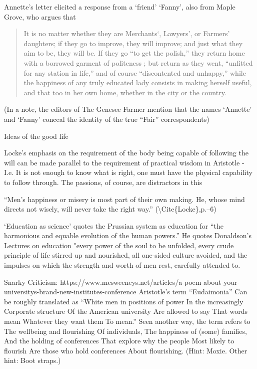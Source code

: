Annette's letter elicited a response from a `friend' `Fanny', also from Maple Grove, who argues that 

\begin{quote}

It is no matter whether they are Merchants`, Lawyers', or Farmers' daughters; if they go to improve, they will improve; and just what they aim to be, they will be. If they go ``to get the polish,'' they return home with a borrowed garment of politeness ; but return as they went, ``unfitted for any station in life,'' and of course ``discontented and unhappy,'' while the happiness of any truly educated lady consists in making herself useful, and that too in her own home, whether in the city or the country. ~\citep[p. 128]{Fanny:1840tu}
\end{quote}

(In a note, the editors of The Genesee Farmer mention that the names `Annette' and `Fanny' conceal the identity of the true ``Fair'' correspondents) 

Ideas of the good life

Locke's emphasis on the requirement of the body being capable of following the will can be made parallel to the requirement of practical wisdom in Aristotle - I.e. It is not enough to know what is right, one must have the physical capability to follow through. The passions, of course, are distractors in this

``Men's happiness or misery is most part of their own making. He, whose mind directs not wisely, will never take the right way.'' (\textbackslash{}Cite\{Locke\},p.--6)

`Education as science' quotes the Prussian system as education for ``the harmonious and equable evolution of the human powers.'' He quotes Donaldson's Lectures on education "every power of the soul to be unfolded, every crude principle of life stirred up and nourished, all one-sided culture avoided, and the impulses on which the strength and worth of men rest, carefully attended to.

Snarky Criticism: https:\slash \slash www.mcsweeneys.net\slash articles\slash a-poem-about-your-universitys-brand-new-institutes-conference
Aristotle's term ``Eudaimonia''
Can be roughly translated as
``White men in positions of power
In the increasingly
Corporate structure
Of the American university
Are allowed to say
That words mean
Whatever they want them
To mean.''
Seen another way, the term refers to
The wellbeing and flourishing
Of individuals,
The happiness of (some) families,
And the holding of conferences
That explore why the people
Most likely to flourish
Are those who hold conferences
About flourishing.
(Hint: Moxie. Other hint: Boot straps.)

